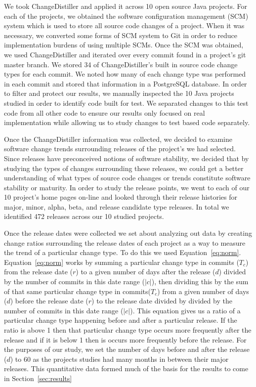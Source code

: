 \documentclass[conference]{IEEEtran}
\begin{document}
We took ChangeDistiller and applied it across 10 open source Java projects. For each of the projects, we obtained the software configuration management (SCM) system
which is used to store all source code changes of a project. When it was necessary, we converted some forms of SCM system to Git in order to reduce implementation
burdens of using multiple SCMs. Once the SCM was obtained, we used ChangeDistiller and iterated over every commit found in a project's git master branch. We stored
34 of ChangeDistiller's built in source code change types for each commit. We noted how many of each change type was performed in each commit and stored that information
in a PostgreSQL database. In order to filter and protect our results, we manually inspected the 10 Java projects studied in order to identify code built for test.
We separated changes to this test code from all other code to ensure our results only focused on real implementation while allowing us to study changes to
test based code separately.

Once the ChangeDistiller information was collected, we decided to examine software change trends surrounding releases of the project's we had selected. Since releases
have preconceived notions of software stability, we decided that by studying the types of changes surrounding these releases, we could get a better understanding of
what types of source code changes or trends constitute software stability or maturity. In order to study the release points, we went to each of our 10 project's 
home pages on-line and looked through their release histories for major, minor, alpha, beta, and release candidate type releases. In total we identified 472 releases
across our 10 studied projects.  

Once the release dates were collected we set about analyzing out data by creating change ratios surrounding the release dates of each project as a way to measure
the trend of a particular change type. 
To do this we used Equation~\ref{eq:norm}. Equation~\ref{eq:norm} works by summing a particular change type in commits ($T_c$)
from the release date ($r$) to a given number of days after the release ($d$) divided by the number of commits in this date range ($|c|$), then dividing
this by the sum of that same particular change type in commits($T_c$) from a given number of days ($d$) before the release date ($r$) to
the release date divided by divided by the number of commits in this date range ($|c|$). 
This equation gives us a ratio of a particular change type happening before and after a particular release. If the ratio is above 1 then that particular change
type occurs more frequently after the release and if it is below 1 then is occurs more frequently before the release. For the purposes of our study, we set the
number of days before and after the release ($d$) to 60 as the projects studies had many months in between their major releases. This quantitative data
formed much of the basis for the results to come in Section~\ref{sec:results}
\end{document}
